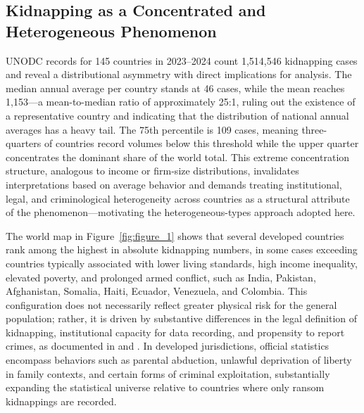 \documentclass[12pt,a4paper]{article}
\providecommand{\textcite}{\citet}
\providecommand{\parencite}{\citep}
\theoremstyle{plain}
\theoremstyle{definition}
\theoremstyle{remark}
\newcommand{\1}{\mathbf{1}}
\begin{document}
\subsection{Kidnapping as a Concentrated and Heterogeneous Phenomenon}

UNODC records \parencite{unodc_Data} for 145 countries in 2023--2024 count
1,514,546 kidnapping cases and reveal a distributional asymmetry with direct
implications for analysis. The median annual average per country stands at 46 cases,
while the mean reaches 1,153---a mean-to-median ratio of approximately 25:1,
ruling out the existence of a representative country and indicating that the
distribution of national annual averages has a heavy tail. The 75th percentile is 109
cases, meaning three-quarters of countries record volumes below this threshold while
the upper quarter concentrates the dominant share of the world total. This extreme
concentration structure, analogous to income or firm-size distributions, invalidates
interpretations based on average behavior and demands treating institutional, legal,
and criminological heterogeneity across countries as a structural attribute of the
phenomenon---motivating the heterogeneous-types approach adopted here.

The world map in Figure~\ref{fig:figure_1} shows that several developed countries
rank among the highest in absolute kidnapping numbers, in some cases exceeding
countries typically associated with lower living standards, high income inequality,
elevated poverty, and prolonged armed conflict, such as India, Pakistan, Afghanistan,
Somalia, Haiti, Ecuador, Venezuela, and Colombia. This configuration does not
necessarily reflect greater physical risk for the general population; rather, it is
driven by substantive differences in the legal definition of kidnapping, institutional
capacity for data recording, and propensity to report crimes, as documented in
\textcite{UNODC2006Manual} and \textcite{UNODC2016ICCS}. In developed jurisdictions,
official statistics encompass behaviors such as parental abduction, unlawful
deprivation of liberty in family contexts, and certain forms of criminal exploitation,
substantially expanding the statistical universe relative to countries where only
ransom kidnappings are recorded.
\end{document}
